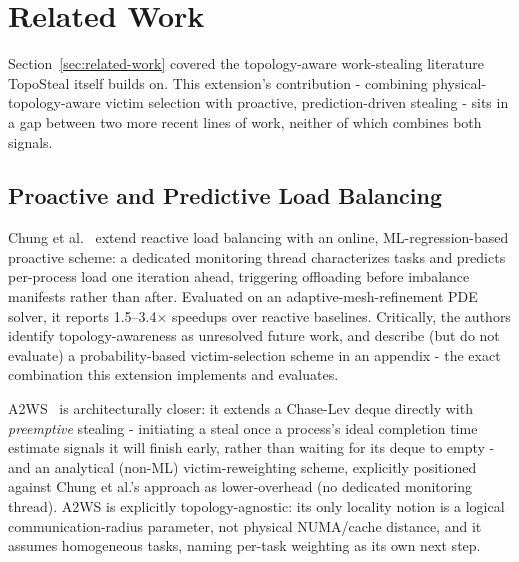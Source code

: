%

\section{Related Work}
\label{sec:related-work-ext}

Section~\ref{sec:related-work} covered the topology-aware work-stealing
literature TopoSteal itself builds on. This extension's contribution -
combining physical-topology-aware victim selection with proactive,
prediction-driven stealing - sits in a gap between two more recent lines
of work, neither of which combines both signals.

\subsection{Proactive and Predictive Load Balancing}

Chung et al.~\cite{chung2023reactive} extend reactive load balancing with
an online, ML-regression-based proactive scheme: a dedicated monitoring
thread characterizes tasks and predicts per-process load one iteration
ahead, triggering offloading before imbalance manifests rather than after.
Evaluated on an adaptive-mesh-refinement PDE solver, it reports 1.5--3.4$\times$
speedups over reactive baselines. Critically, the authors identify
topology-awareness as unresolved future work, and describe (but do not
evaluate) a probability-based victim-selection scheme in an appendix -
the exact combination this extension implements and evaluates.

A2WS~\cite{a2ws2024} is architecturally closer: it extends a Chase-Lev
deque directly with \emph{preemptive} stealing - initiating a steal once a
process's ideal completion time estimate signals it will finish early,
rather than waiting for its deque to empty - and an analytical (non-ML)
victim-reweighting scheme, explicitly positioned against Chung et
al.'s approach as lower-overhead (no dedicated monitoring thread). A2WS
is explicitly topology-agnostic: its only locality notion is a logical
communication-radius parameter, not physical NUMA/cache distance, and it
assumes homogeneous tasks, naming per-task weighting as its own next step.

